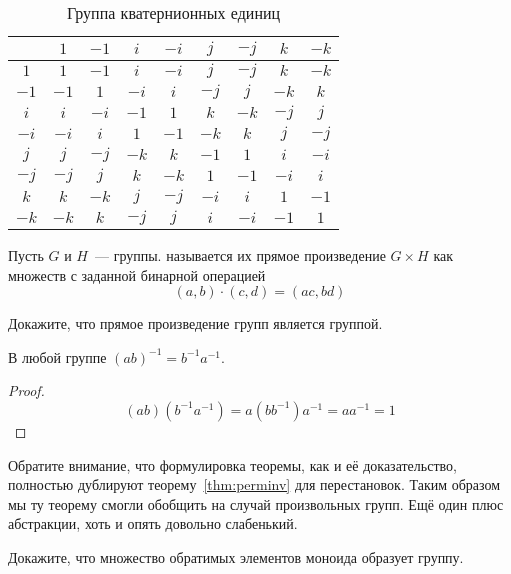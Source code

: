 \begin{table}[h]
	\centering
	\begin{tabular}{c|cccccccc}
		& $1$ & $-1$ & $i$ & $-i$ & $j$ & $-j$ & $k$ & $-k$ \\ 
		\hline $1$ & $1$ & $-1$ & $i$ & $-i$ & $j$ & $-j$ & $k$ & $-k$  \\ 
		$-1$ & $-1$ & $1$&$-i$ &$i$ & $-j$ & $j$ & $-k$ & $k$ \\ 
		$i$ & $i$ & $-i$ & $-1$ & $1$ & $k$& $-k$ & $-j$ & $j$ \\ 
		$-i$ & $-i$ & $i$ & $1$ & $-1$ & $-k$& $k$ & $j$ & $-j$ \\ 
		$j$ & $j$ & $-j$ & $-k$ &$k$ & $-1$& $1$ & $i$ & $-i$ \\ 
		$-j$ & $-j$ & $j$ & $k$ &$-k$ & $1$& $-1$ & $-i$ & $i$ \\ 
		$k$ & $k$ & $-k$ & $j$ & $-j$ &$-i$ & $i$  & $1$ &$-1$  \\ 
		$-k$ & $-k$ & $k$ & $-j$ & $j$ &$i$ & $-i$  & $-1$ &$1$  \\ 
	\end{tabular}
	\caption{Группа кватернионных единиц}\label{tb:qtgrp}
\end{table}

\begin{definition}
	Пусть $G$ и $H$~--- группы.  называется их прямое произведение $G\times H$ как множеств с заданной бинарной операцией
	\[
	(a, b) \cdot (c, d) = (ac, bd)
	\]
\end{definition}

\begin{exercise}
	Докажите, что прямое произведение групп является группой.
\end{exercise}

\begin{thm}
	В любой группе $(ab)^{-1}=b^{-1}a^{-1}$.
\end{thm}
\begin{proof}
	\[
	(ab)(b^{-1}a^{-1}) = a(bb^{-1})a^{-1} = aa^{-1} = 1
	\]
\end{proof}

Обратите внимание, что формулировка теоремы, как и её доказательство, полностью дублируют теорему~\ref{thm:perminv} для перестановок. Таким образом мы ту теорему смогли обобщить на случай произвольных групп. Ещё один плюс абстракции, хоть и опять довольно слабенький.

\begin{exercise}
	Докажите, что множество обратимых элементов моноида образует группу.
\end{exercise}

